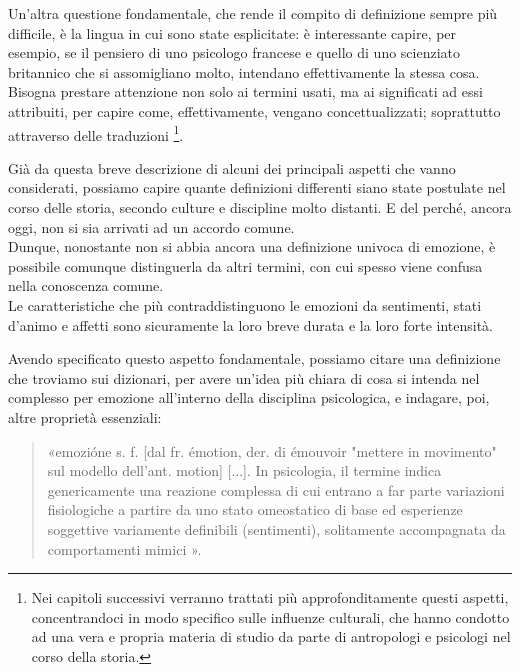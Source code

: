 Un'altra questione fondamentale, che rende il compito di definizione sempre più difficile, è la lingua in cui sono state esplicitate: è interessante capire, per esempio, se il pensiero di uno psicologo francese e quello di uno scienziato britannico che si assomigliano molto, intendano effettivamente la stessa cosa.\\
Bisogna prestare attenzione non solo ai termini usati, ma ai significati ad essi attribuiti, per capire come, effettivamente, vengano concettualizzati; soprattutto attraverso delle traduzioni \footnote{Nei capitoli successivi verranno trattati più approfonditamente questi aspetti, concentrandoci in modo specifico sulle influenze culturali, che hanno condotto ad una vera e propria materia di studio da parte di antropologi e psicologi nel corso della storia.}.

Già da questa breve descrizione di alcuni dei principali aspetti che vanno considerati, possiamo capire quante definizioni differenti siano state postulate nel corso delle storia, secondo culture e discipline molto distanti. E del perché, ancora oggi, non si sia arrivati ad un accordo comune. \\
Dunque, nonostante non si abbia ancora una definizione univoca di emozione, è possibile comunque distinguerla da altri termini, con cui spesso viene confusa nella conoscenza comune.\\
Le caratteristiche che più contraddistinguono le emozioni da sentimenti, stati d'animo e affetti sono sicuramente la loro breve durata e la loro forte intensità.

Avendo specificato questo aspetto fondamentale, possiamo citare una definizione che troviamo sui dizionari, per avere un'idea più chiara di cosa si intenda nel complesso per emozione all'interno della disciplina psicologica, e indagare, poi,  altre proprietà essenziali: 
\begin{quote}
    «emozióne s. f. [dal fr. émotion, der. di émouvoir "mettere in movimento" sul modello dell’ant. motion] [...]. In psicologia, il termine indica genericamente una reazione complessa di cui entrano a far parte variazioni fisiologiche a partire da uno stato omeostatico di base ed esperienze soggettive variamente definibili (sentimenti), solitamente accompagnata da comportamenti mimici \parencite{definizione_emozioni}». 
\end{quote}


